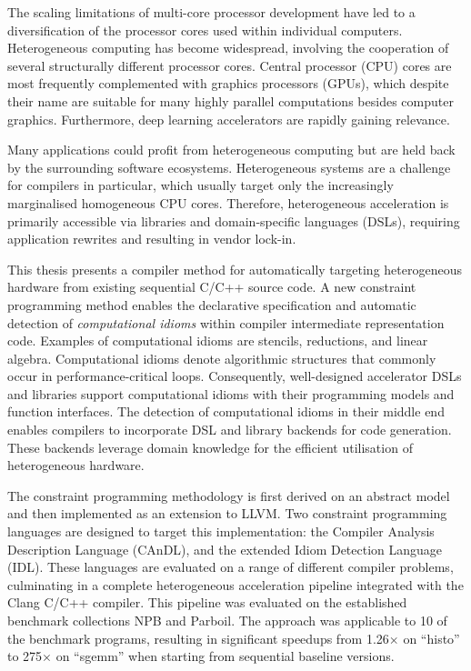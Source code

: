     The scaling limitations of multi-core processor development have led to a
    diversification of the processor cores used within individual computers.
    Heterogeneous computing has become widespread, involving the cooperation of
    several structurally different processor cores.
    Central processor (CPU) cores are most frequently complemented with graphics
    processors (GPUs), which despite their name are suitable for many highly
    parallel computations besides computer graphics.
    Furthermore, deep learning accelerators are rapidly gaining relevance.

    Many applications could profit from heterogeneous computing but are held
    back by the surrounding software ecosystems.
    Heterogeneous systems are a challenge for compilers in particular, which
    usually target only the increasingly marginalised homogeneous CPU cores.
    Therefore, heterogeneous acceleration is primarily accessible via libraries
    and domain-specific languages (DSLs), requiring application rewrites and
    resulting in vendor lock-in.

    This thesis presents a compiler method for automatically targeting
    heterogeneous hardware from existing sequential C/C++ source code.
    A new constraint programming method enables the declarative
    specification and automatic detection of {\em computational idioms} within
    compiler intermediate representation code.
    Examples of computational idioms are stencils, reductions, and
    linear algebra.
    Computational idioms denote algorithmic structures that commonly occur in
    performance-critical loops.
    Consequently, well-designed accelerator DSLs and libraries support
    computational idioms with their programming models and function interfaces.
    The detection of computational idioms in their middle end enables
    compilers to incorporate DSL and library backends for code generation.
    These backends leverage domain knowledge for the efficient utilisation of
    heterogeneous hardware.

    The constraint programming methodology is first derived on an abstract
    model and then implemented as an extension to LLVM.
    Two constraint programming languages are designed to target this
    implementation:
    the Compiler Analysis Description Language (CAnDL), and the extended
    Idiom Detection Language (IDL).
    These languages are evaluated on a range of different compiler problems,
    culminating in a complete heterogeneous acceleration pipeline integrated
    with the Clang C/C++ compiler.
    This pipeline was evaluated on the established benchmark collections NPB
    and Parboil.
    The approach was applicable to 10 of the benchmark programs, resulting in
    significant speedups from 1.26$\times$ on ``histo'' to 275$\times$ on
    ``sgemm'' when starting from sequential baseline versions.

